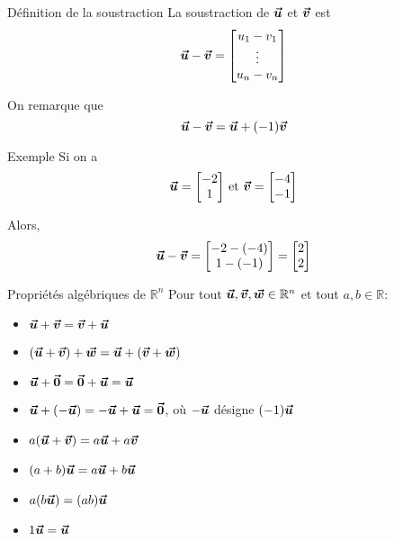 \documentclass{article}
\begin{document}
\begin{parag}{Définition de la soustraction}
    La soustraction de $\bm{\protect\vec{u}}$ et $\bm{\protect\vec{v}}$ est
    \[\bm{\protect\vec{u}} - \bm{\protect\vec{v}} = \begin{bmatrix} u_1 - v_1 \\ \vdots \\ u_n - v_n \end{bmatrix} \]

    On remarque que
    \[\bvec{u} - \bvec{v} = \bvec{u} + \left(-1\right) \bvec{v}\]
\end{parag}

\begin{parag}{Exemple}
    Si on a
    \[\bvec{u} = \begin{bmatrix} -2 \\ 1 \end{bmatrix} \text{ et } \bvec{v} = \begin{bmatrix} -4 \\ -1 \end{bmatrix} \]

    Alors,
    \[\bvec{u} - \bvec{v} = \begin{bmatrix} -2 - \left(-4\right) \\ 1 - \left(-1\right) \end{bmatrix} = \begin{bmatrix} 2 \\ 2 \end{bmatrix} \]
\end{parag}

\begin{parag}{Propriétés algébriques de $\mathbb{R}^n$}
    Pour tout $\bm{\protect\vec{u}}, \bm{\protect\vec{v}}, \bm{\protect\vec{w}} \in \mathbb{R}^n$ et tout $a,b \in\mathbb{R}$:
    \begin{itemize}
        \item $\bm{\protect\vec{u}} + \bm{\protect\vec{v}} = \bm{\protect\vec{v}} + \bm{\protect\vec{u}}$
        \item $\left(\bvec{u} + \bvec{v}\right) + \bvec{w} = \bvec{u} + \left(\bvec{v} + \bvec{w}\right)$
        \item $\bm{\protect\vec{u}} + \bm{\protect\vec{0}} = \bm{\protect\vec{0}} + \bm{\protect\vec{u}} = \bm{\protect\vec{u}}$
        \item $\bvec{u} + \left(-\bvec{u}\right) = -\bvec{u} + \bvec{u} = \bvec{0}$, où $-\bm{\protect\vec{u}}$ désigne $\left(-1\right) \bvec{u}$
        \item $a\left(\bvec{u} + \bvec{v}\right) = a \bvec{u} + a \bvec{v}$
        \item $\left(a + b\right)\bvec{u} = a \bvec{u} + b \bvec{u}$
        \item $a\left(b \bvec{u}\right) = \left(ab\right) \bvec{u}$
        \item $1 \bm{\protect\vec{u}} = \bm{\protect\vec{u}}$
    \end{itemize}
\end{parag}
\end{document}
